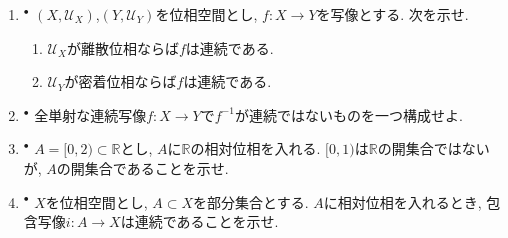 \documentclass[dvipdfmx,a4paper,11pt]{article}
\newcommand{\R}{\mathbb{R}}
\theoremstyle{definition}
\begin{document}
\begin{enumerate}[ label=\textbf{問}\ref*{sec-conti}.\arabic*]
\setlength{\parskip}{0cm}
  \setlength{\itemsep}{7pt} 
 

\item $^\bullet$ $(X,\mathscr{U}_X )$,$(Y,\mathscr{U}_Y)$を位相空間とし, $f : X \rightarrow Y$を写像とする. 次を示せ. 
	\begin{enumerate}
	\setlength{\parskip}{0cm} 
  \setlength{\itemsep}{0pt} 
	\item $\mathscr{U}_X $が離散位相ならば$f$は連続である.
	\item $\mathscr{U}_Y $が密着位相ならば$f$は連続である.
	\end{enumerate}

 \item $^\bullet$  全単射な連続写像$f :  X \rightarrow Y$で$f^{-1}$が連続ではないものを一つ構成せよ. 
 
\item $^\bullet$ $A=[0,2) \subset \R$とし, $A$に$\R$の相対位相を入れる. $[0,1)$は$\R$の開集合ではないが, $A$の開集合であることを示せ. 

\item $^\bullet$ $X$を位相空間とし, $A\subset X$を部分集合とする. $A$に相対位相を入れるとき, 包含写像$i: A \to X$は連続であることを示せ. 


\end{enumerate}
\end{document}
